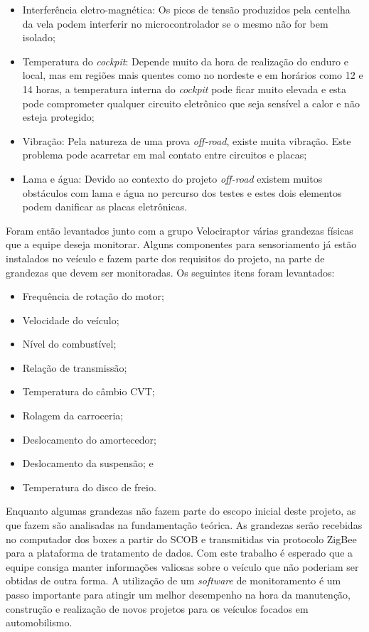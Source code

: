 \begin{itemize}
	\item  Interferência eletro-magnética: Os picos de tensão produzidos pela centelha da vela podem interferir no microcontrolador se o mesmo não for bem isolado; 
	\item Temperatura do \textit{cockpit}: Depende muito da hora de realização do enduro e local, mas em regiões mais quentes como no nordeste e em horários como 12 e 14 horas, a temperatura interna do \textit{cockpit} pode ficar muito elevada e esta pode comprometer qualquer circuito eletrônico que seja sensível a calor e não esteja protegido; 
	\item Vibração: Pela natureza de uma prova \textit{off-road}, existe muita vibração. Este problema pode acarretar em mal contato entre circuitos e placas;
	\item Lama e água: Devido ao contexto do projeto \textit{off-road} existem muitos obstáculos com lama e água no percurso dos testes e estes dois elementos podem danificar as placas eletrônicas.
\end{itemize}

Foram então levantados junto com a grupo Velociraptor várias grandezas físicas que a equipe deseja monitorar. Alguns componentes para sensoriamento já estão instalados no veículo e fazem parte dos requisitos do projeto, na parte de grandezas que devem ser monitoradas. Os seguintes itens foram levantados: 

\begin{itemize}
	\item Frequência de rotação do motor;
	\item Velocidade do veículo;
	\item Nível do combustível;
	\item Relação de transmissão;
	\item Temperatura do câmbio CVT;
	\item Rolagem da carroceria;
	\item Deslocamento do amortecedor;
	\item Deslocamento da suspensão; e
	\item Temperatura do disco de freio.
\end{itemize}

Enquanto algumas grandezas não fazem parte do escopo inicial deste projeto, as que fazem são analisadas na fundamentação teórica. As grandezas serão recebidas no computador dos boxes a partir do SCOB e transmitidas via protocolo ZigBee para a plataforma de tratamento de dados. Com este trabalho é esperado que a equipe consiga manter informações valiosas sobre o veículo que não poderiam ser obtidas de outra forma. A utilização de um \textit{software} de monitoramento é um passo importante para atingir um melhor desempenho na hora da manutenção, construção e realização de novos projetos para os veículos focados em automobilismo.   

